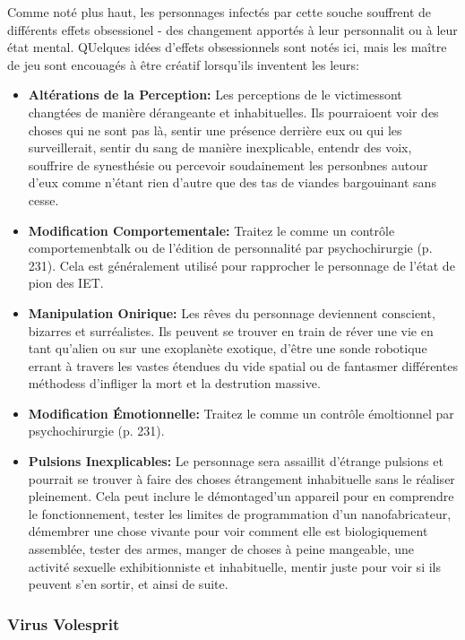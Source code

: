 Comme noté plus haut, les personnages infectés par cette souche souffrent de différents effets obsessionel - des changement apportés à leur personnalit ou à leur état mental. QUelques idées d'effets obsessionnels sont notés ici, mais les maître de jeu sont encouagés à être créatif lorsqu'ils inventent les leurs: 

\begin{itemize} \item \textbf{Altérations de la Perception:} Les perceptions de le victimessont changtées de manière dérangeante et inhabituelles. Ils pourraioent voir des choses qui ne sont pas là, sentir une présence derrière eux ou qui les surveillerait, sentir du sang de manière inexplicable, entendr des voix, souffrire de synesthésie ou percevoir soudainement les personbnes autour d'eux comme n'étant rien d'autre que des tas de viandes bargouinant sans cesse. \item \textbf{Modification Comportementale:} Traitez le comme un contrôle comportemenbtalk ou de l'édition de personnalité par psychochirurgie (p. 231). Cela est généralement utilisé pour rapprocher le personnage de l'état de pion des IET. \item \textbf{Manipulation Onirique:} Les rêves du personnage deviennent conscient, bizarres et surréalistes. Ils peuvent se trouver en train de réver une vie en tant qu'alien ou sur une exoplanète exotique, d'être une sonde robotique errant à travers les vastes étendues du  vide spatial ou de fantasmer différentes méthodess d'infliger la mort et la destrution massive. \item \textbf{Modification Émotionnelle:} Traitez le comme un contrôle émoltionnel par psychochirurgie (p. 231). \item \textbf{Pulsions Inexplicables:} Le personnage sera assaillit d'étrange pulsions et pourrait se trouver à faire des choses étrangement inhabituelle sans le réaliser pleinement. Cela peut inclure le démontaged'un appareil pour en comprendre le fonctionnement, tester les limites de programmation d'un nanofabricateur, démembrer une chose vivante pour voir comment elle est biologiquement assemblée, tester des armes, manger de choses à peine mangeable, une activité sexuelle exhibitionniste et inhabituelle, mentir juste pour voir si ils peuvent s'en sortir, et ainsi de suite. \end{itemize} 

\subsubsection{Virus Volesprit} 

